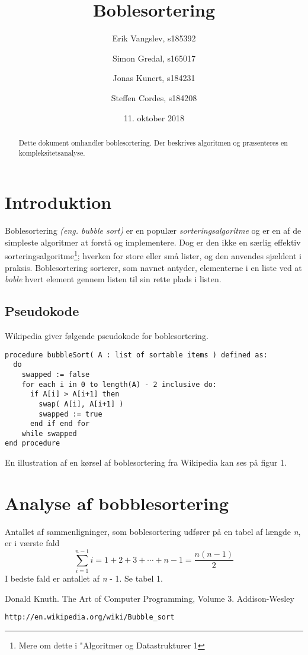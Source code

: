 \documentclass[a4paper]{article}
\begin{document}
\title{Boblesortering}
\author{
   Erik Vangslev, s185392
   \and
   Simon Gredal, s165017
   \and
   Jonas Kunert, s184231
   \and
   Steffen Cordes, s184208}
\date{11. oktober 2018}
\maketitle

\begin{abstract}
Dette dokument omhandler boblesortering. Der beskrives algoritmen og præsenteres en kompleksitetsanalyse.
\end{abstract}

\section{Introduktion}
Boblesortering \textit{(eng. bubble sort)} er en populær \textit{sorteringsalgoritme} og er en af de simpleste algoritmer at forstå og implementere. Dog er den ikke en særlig effektiv sorteringsalgoritme\footnote{Mere om dette i "Algoritmer og Datastrukturer 1}; hverken for store eller små lister, og den anvendes sjældent i praksis. Boblesortering sorterer, som navnet antyder, elementerne i en liste ved at \textit{boble} hvert element gennem listen til sin rette plads i listen.

\subsection{Pseudokode}
Wikipedia \cite{WikiBubble} giver følgende pseudokode for boblesortering.

\begin{verbatim}
procedure bubbleSort( A : list of sortable items ) defined as:
  do
    swapped := false
    for each i in 0 to length(A) - 2 inclusive do:
      if A[i] > A[i+1] then
        swap( A[i], A[i+1] )
        swapped := true
      end if end for
    while swapped
end procedure
\end{verbatim}
En illustration af en kørsel af boblesortering fra Wikipedia kan ses på figur 1.

\section{Analyse af bobblesortering}
Antallet af sammenligninger, som boblesortering udfører på en tabel af længde \emph{n},
er i værste fald
\[ 
\displaystyle\sum_{i=1}^{n-1} i = 1 + 2 + 3 + \cdots + n - 1 = \frac{n(n - 1)}{2}
\]
I bedste fald er antallet af \emph{n} - 1. Se tabel 1.

\begin{thebibliography}{99}

  Donald Knuth.
  The Art of Computer Programming,
  Volume 3.
  Addison-Wesley

\begin{verbatim}
http://en.wikipedia.org/wiki/Bubble_sort
\end{verbatim}

\end{thebibliography}
\end{document}
